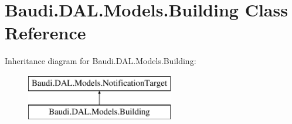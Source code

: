 \hypertarget{class_baudi_1_1_d_a_l_1_1_models_1_1_building}{}\section{Baudi.\+D\+A\+L.\+Models.\+Building Class Reference}
\label{class_baudi_1_1_d_a_l_1_1_models_1_1_building}
Inheritance diagram for Baudi.\+D\+A\+L.\+Models.\+Building\+:\begin{figure}[H]
\begin{center}
\leavevmode
\includegraphics[height=2.000000cm]{class_baudi_1_1_d_a_l_1_1_models_1_1_building}
\end{center}
\end{figure}
